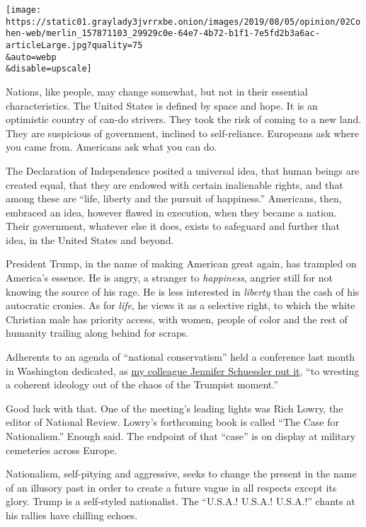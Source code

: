 \texttt{[image: https://static01.graylady3jvrrxbe.onion/images/2019/08/05/opinion/02Cohen-web/merlin\_157871103\_29929c0e-64e7-4b72-b1f1-7e5fd2b3a6ac-articleLarge.jpg?quality=75\\\&auto=webp\\\&disable=upscale]}

Nations, like people, may change somewhat, but not in their essential
characteristics. The United States is defined by space and hope. It is
an optimistic country of can-do strivers. They took the risk of coming
to a new land. They are suspicious of government, inclined to
self-reliance. Europeans ask where you came from. Americans ask what you
can do.

The Declaration of Independence posited a universal idea, that human
beings are created equal, that they are endowed with certain inalienable
rights, and that among these are ``life, liberty and the pursuit of
happiness.'' Americans, then, embraced an idea, however flawed in
execution, when they became a nation. Their government, whatever else it
does, exists to safeguard and further that idea, in the United States
and beyond.

President Trump, in the name of making American great again, has
trampled on America's essence. He is angry, a stranger to
\emph{happiness}, angrier still for not knowing the source of his rage.
He is less interested in \emph{liberty} than the cash of his autocratic
cronies. As for \emph{life}, he views it as a selective right, to which
the white Christian male has priority access, with women, people of
color and the rest of humanity trailing along behind for scraps.

Adherents to an agenda of ``national conservatism'' held a conference
last month in Washington dedicated, as
\href{https://www.nytimes3xbfgragh.onion/2019/07/19/arts/trump-nationalism-tucker-carlson.html?rref=collection\%2Fbyline\%2Fjennifer-schuessler\&action=click\&contentCollection=undefined\&region=stream\&module=stream_unit\&version=latest\&contentPlacement=1\&pgtype=collection}{my
colleague Jennifer Schuessler put it}, ``to wresting a coherent ideology
out of the chaos of the Trumpist moment.''

Good luck with that. One of the meeting's leading lights was Rich Lowry,
the editor of National Review. Lowry's forthcoming book is called ``The
Case for Nationalism.'' Enough said. The endpoint of that ``case'' is on
display at military cemeteries across Europe.

Nationalism, self-pitying and aggressive, seeks to change the present in
the name of an illusory past in order to create a future vague in all
respects except its glory. Trump is a self-styled nationalist. The
``U.S.A.! U.S.A.! U.S.A.!'' chants at his rallies have chilling echoes.

